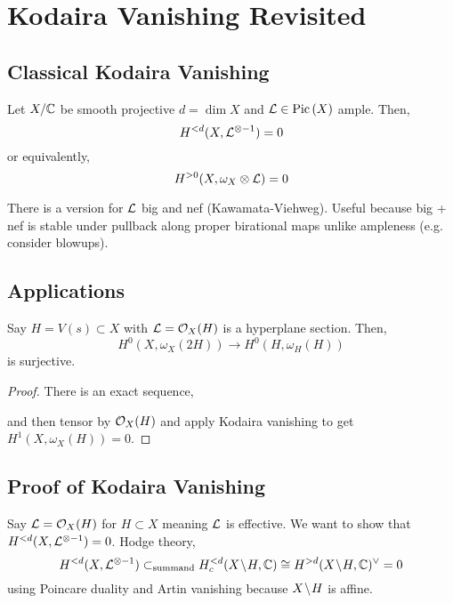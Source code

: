 \documentclass[12pt]{article}
\begin{document}
\section{Kodaira Vanishing Revisited}

\subsection{Classical Kodaira Vanishing}

\begin{theorem}
Let $X / \mathbb{C}$ be smooth projective $d = \dim{X}$ and $\mathcal{L} \in \mathrm{Pic} \left( X \right)$ ample. Then,
\[ H^{< d}(X, \mathcal{L}^{\otimes -1}) = 0 \]
or equivalently,
\[ H^{> 0}(X, \omega_X \otimes \mathcal{L}) = 0 \] 
\end{theorem}

\begin{rmk}
There is a version for $\mathcal{L}$ big and nef (Kawamata-Viehweg). Useful because big + nef is stable under pullback along proper birational maps unlike ampleness (e.g. consider blowups). 
\end{rmk}

\subsection{Applications}

Say $H = V(s) \subset X$ with $\mathcal{L} = \mathcal{O}_{X}(H)$ is a hyperplane section. Then,
\[ H^0(X, \omega_X(2H)) \to H^0(H, \omega_H(H)) \]
is surjective. 

\begin{proof}
There is an exact sequence,
\begin{center}
\end{center}
and then tensor by $\mathcal{O}_{X}(H)$ and apply Kodaira vanishing to get $H^1(X, \omega_X(H)) = 0$.
\end{proof}

\subsection{Proof of Kodaira Vanishing}

Say $\mathcal{L} = \mathcal{O}_{X}(H)$ for $H \subset X$ meaning $\mathcal{L}$ is effective. We want to show that $H^{<d}(X, \mathcal{L}^{\otimes -1}) = 0$. Hodge theory,
\[ H^{<d}(X, \mathcal{L}^{\otimes -1}) \subset_{\text{summand}} H^{<d}_c(X \! \setminus \! H, \mathbb{C}) \cong H^{>d}(X \! \setminus \! H, \mathbb{C})^\vee = 0 \]
using Poincare duality and Artin vanishing because $X \! \setminus \! H$ is affine.  
\end{document}
